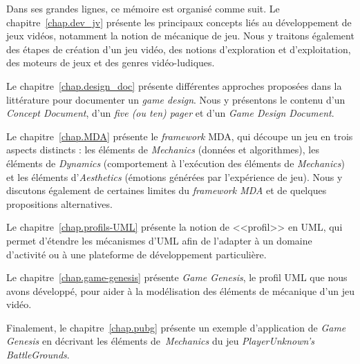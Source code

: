 \begin{introduction}
\begin{comment}
\end{comment}



Dans ses grandes lignes, ce m\'emoire est organis\'e comme suit.
Le chapitre~\ref{chap.dev_jv} pr\'esente les principaux concepts
li\'es au d\'eveloppement de jeux vid\'eos, notamment la notion de mécanique de jeu.
Nous y traitons également des étapes de création d'un jeu vidéo, des notions d'exploration et d'exploitation, des moteurs de jeux et des genres vidéo-ludiques. 


Le chapitre~\ref{chap.design_doc} pr\'esente diff\'erentes approches
propos\'ees dans la litt\'erature pour documenter un \emph{game design}.
Nous y présentons le contenu d'un \emph{Concept Document}, d'un \emph{five (ou ten) pager} et d'un \emph{Game Design Document}.

Le chapitre~\ref{chap.MDA} pr\'esente le \emph{framework} MDA, qui découpe un jeu en trois aspects distincts : les éléments de \emph{Mechanics} (données et algorithmes), les éléments de \emph{Dynamics} (comportement à l'exécution des éléments de \emph{Mechanics}) et les éléments d'\emph{Aesthetics} (émotions générées par l'expérience de jeu). Nous y discutons également de certaines limites du \emph{framework MDA} et de quelques propositions alternatives.

Le chapitre~\ref{chap.profils-UML} pr\'esente la notion de <<profil>>
en UML, qui permet d'étendre les mécanismes d'UML afin de l'adapter à un domaine d'activité ou à une plateforme de développement particulière.

Le chapitre~\ref{chap.game-genesis} pr\'esente \emph{Game Genesis}, le
profil UML que nous avons d\'evelopp\'e, pour aider \`a la
mod\'elisation des \'el\'ements de m\'ecanique d'un jeu vid\'eo.

Finalement, le chapitre~\ref{chap.pubg} pr\'esente un exemple d'application de \emph{Game Genesis} en décrivant les éléments de~\emph{Mechanics} du jeu \emph{PlayerUnknown's BattleGrounds}.




\end{introduction}

